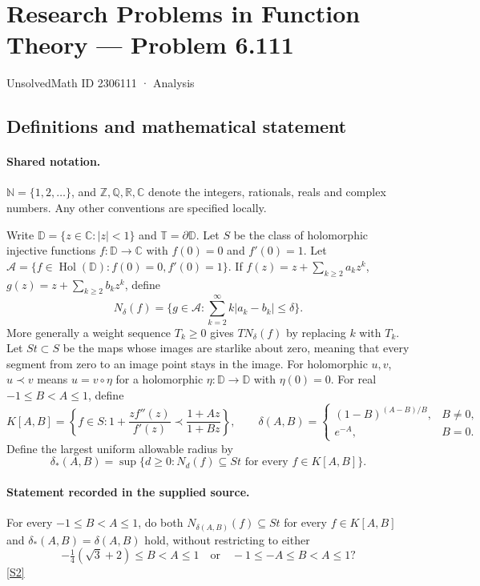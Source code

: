 \documentclass[11pt]{article}
\newcommand{\sref}[2]{\hyperlink{source:#1:#2}{[S#2]}}
\begin{document}
\setcounter{section}{2306110}
\section{Research Problems in Function Theory — Problem 6.111}\label{2306111}
{\small\sffamily UnsolvedMath ID 2306111 · Analysis}
\subsection{Definitions and mathematical statement}

\paragraph{Shared notation.}$\mathbb N=\{1,2,\ldots\}$, and $\mathbb Z,\mathbb Q,\mathbb R,\mathbb C$ denote the integers, rationals, reals and complex numbers. Any other conventions are specified locally.


Write $\mathbb D=\{z\in\mathbb C:|z|<1\}$ and $\mathbb T=\partial\mathbb D$. Let $S$ be the class of holomorphic injective functions $f:\mathbb D\to\mathbb C$ with $f(0)=0$ and $f'(0)=1$. Let $\mathcal A=\{f\in\operatorname{Hol}(\mathbb D):f(0)=0,f'(0)=1\}$. If $f(z)=z+\sum_{k\geq2}a_kz^k$, $g(z)=z+\sum_{k\geq2}b_kz^k$, define
\[N_\delta(f)=\{g\in\mathcal A:\sum_{k=2}^{\infty}k|a_k-b_k|\leq\delta\}.\]
More generally a weight sequence $T_k\geq0$ gives $TN_\delta(f)$ by replacing $k$ with $T_k$. Let $St\subset S$ be the maps whose images are starlike about zero, meaning that every segment from zero to an image point stays in the image. For holomorphic $u,v$, $u\prec v$ means $u=v\circ\eta$ for a holomorphic $\eta:\mathbb D\to\mathbb D$ with $\eta(0)=0$. For real $-1\leq B<A\leq1$, define
\[K[A,B]=\left\{f\in S:1+\frac{zf''(z)}{f'(z)}\prec\frac{1+Az}{1+Bz}\right\},\qquad
\delta(A,B)=\begin{cases}(1-B)^{(A-B)/B},&B\ne0,\\e^{-A},&B=0.\end{cases}\]
Define the largest uniform allowable radius by
\[\delta_*(A,B)=\sup\{d\geq0:N_d(f)\subseteq St\text{ for every }f\in K[A,B]\}.\]
\paragraph{Statement recorded in the supplied source.}
For every $-1\leq B<A\leq1$, do both $N_{\delta(A,B)}(f)\subseteq St$ for every $f\in K[A,B]$ and $\delta_*(A,B)=\delta(A,B)$ hold, without restricting to either
\[-\tfrac14(\sqrt3+2)\leq B<A\leq1\quad\text{or}\quad -1\leq-A\leq B<A\leq1?\] \sref{2306111}{2}
\end{document}
